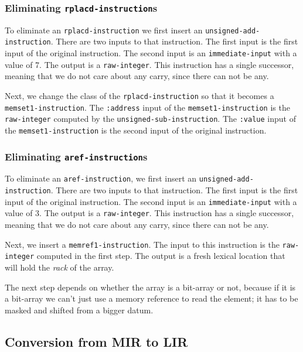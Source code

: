 \subsubsection{Eliminating \texttt{rplacd-instruction}s}

To eliminate an \texttt{rplacd-instruction} we first insert an
\texttt{unsigned-add-instruction}.  There are two inputs to that
instruction.  The first input is the first input of the original
instruction.  The second input is an \texttt{immediate-input} with a
value of 7.  The output is a \texttt{raw-integer}.  This instruction
has a single successor, meaning that we do not care about any carry,
since there can not be any.

Next, we change the class of the \texttt{rplacd-instruction} so that
it becomes a \texttt{memset1-instruction}.  The \texttt{:address}
input of the \texttt{memset1-instruction} is the \texttt{raw-integer}
computed by the \texttt{unsigned-sub-instruction}.  The
\texttt{:value} input of the \texttt{memset1-instruction} is the
second input of the original instruction.

\subsubsection{Eliminating \texttt{aref-instruction}s}

To eliminate an \texttt{aref-instruction}, we first insert an
\texttt{unsigned-add-instruction}.  There are two inputs to that
instruction.  The first input is the first input of the original
instruction.  The second input is an \texttt{immediate-input} with a
value of 3.  The output is a \texttt{raw-integer}.  This instruction
has a single successor, meaning that we do not care about any carry,
since there can not be any.

Next, we insert a \texttt{memref1-instruction}.  The input to this
instruction is the \texttt{raw-integer} computed in the first step.
The output is a fresh lexical location that will hold the \emph{rack}
of the array.

The next step depends on whether the array is a bit-array or not,
because if it is a bit-array we can't just use a memory reference to
read the element; it has to be masked and shifted from a bigger
datum.

\subsection{Conversion from MIR to LIR}


